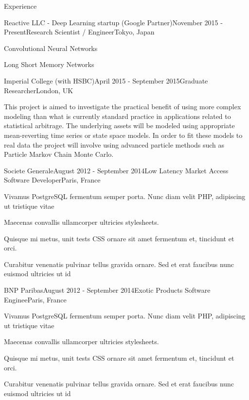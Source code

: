 \documentclass{resume} %
\begin{document}
\begin{rSection}{Experience}

\begin{rSubsection}{Reactive LLC - Deep Learning startup (Google Partner)}{November 2015 - Present}{Research Scientist / Engineer}{Tokyo, Japan}
\item Convolutional Neural Networks
\item Long Short Memory Networks
\end{rSubsection}


\begin{rSubsection}{Imperial College (with HSBC)}{April 2015 - September 2015}{Graduate Researcher}{London, UK}
\item This project is aimed to investigate the practical benefit of using more complex modeling than what is currently standard  practice  in  applications  related  to  statistical  arbitrage.  The  underlying  assets  will  be  modeled  using appropriate mean-reverting time series or state space models. In order to fit these models to real data the project will involve using advanced particle methods such as Particle Markov Chain Monte Carlo.
\end{rSubsection}


\begin{rSubsection}{Societe Generale}{August 2012 - September 2014}{Low Latency Market Access Software Developer}{Paris, France}
\item Vivamus PostgreSQL fermentum semper porta. Nunc diam velit PHP, adipiscing ut tristique vitae
\item Maecenas convallis ullamcorper ultricies stylesheets.
\item Quisque mi metus, unit tests CSS ornare sit amet fermentum et, tincidunt et orci.
\item Curabitur venenatis pulvinar tellus gravida ornare. Sed et erat faucibus nunc euismod ultricies ut id
\end{rSubsection}

\begin{rSubsection}{BNP Paribas}{August 2012 - September 2014}{Exotic Products Software Enginee}{Paris, France}
\item Vivamus PostgreSQL fermentum semper porta. Nunc diam velit PHP, adipiscing ut tristique vitae
\item Maecenas convallis ullamcorper ultricies stylesheets.
\item Quisque mi metus, unit tests CSS ornare sit amet fermentum et, tincidunt et orci.
\item Curabitur venenatis pulvinar tellus gravida ornare. Sed et erat faucibus nunc euismod ultricies ut id
\end{rSubsection}


\end{rSection}
\end{document}
